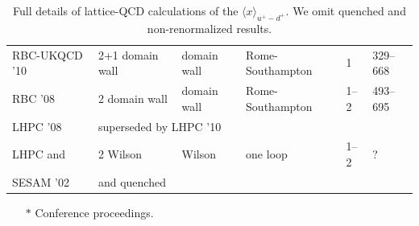 \begin{table}
{\begin{tabular}{llllll}
  RBC-UKQCD '10 \cite{Aoki:2010xg} &
  2+1 domain wall & domain wall & Rome-Southampton & 1 & 329--668 \\

  RBC '08 \cite{Lin:2008uz} &
  2 domain wall & domain wall & Rome-Southampton & 1--2 & 493--695 \\

  LHPC '08 \cite{Hagler:2007xi} &
  \multicolumn{5}{l}{superseded by LHPC '10} \\

  LHPC and &
  2 Wilson & Wilson & one loop & 1--2 & ?\\
  SESAM '02 \cite{Dolgov:2002zm} &
  and quenched & & & \\
\hline
\end{tabular}
} %
\begin{minipage}{\linewidth}
{\footnotesize 
\begin{itemize}
\item[$*$] Conference proceedings.
\end{itemize}
}
\end{minipage}
\caption{Full details of lattice-QCD calculations of the $\langle x\rangle_{u^+-d^+}$. We omit quenched and non-renormalized results.}
\end{table}


